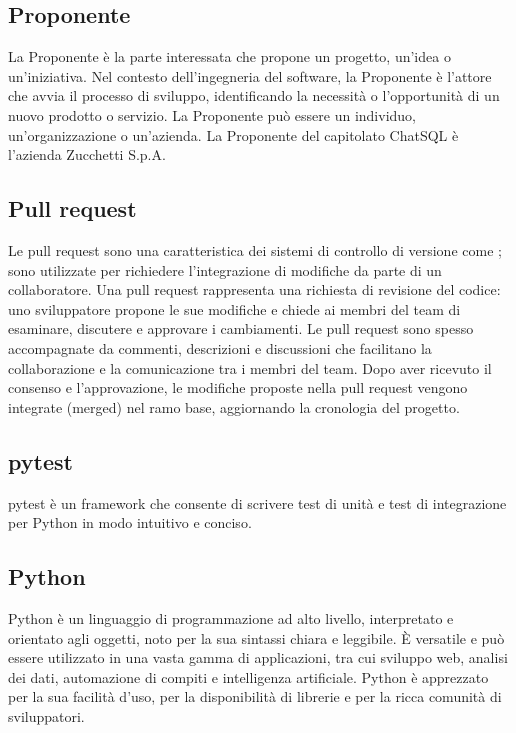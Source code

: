 \vspace{2em}
\subsection*{Proponente}
\par La Proponente è la parte interessata che propone un progetto, un'idea o un'iniziativa. Nel contesto dell'ingegneria del software, la Proponente è l'attore che avvia il processo di sviluppo, identificando la necessità o l'opportunità di un nuovo prodotto o servizio. La Proponente può essere un individuo, un'organizzazione o un'azienda. La Proponente del capitolato ChatSQL è l'azienda Zucchetti S.p.A.

\vspace{2em}
\subsection*{Pull request}
\par Le pull request sono una caratteristica dei sistemi di controllo di versione come ; sono utilizzate per richiedere l'integrazione di modifiche da parte di un collaboratore. Una pull request rappresenta una richiesta di revisione del codice: uno sviluppatore propone le sue modifiche e chiede ai membri del team di esaminare, discutere e approvare i cambiamenti. Le pull request sono spesso accompagnate da commenti, descrizioni e discussioni che facilitano la collaborazione e la comunicazione tra i membri del team. Dopo aver ricevuto il consenso e l'approvazione, le modifiche proposte nella pull request vengono integrate (merged) nel ramo base, aggiornando la cronologia del progetto.

\vspace{2em}
\subsection*{pytest}
\par pytest è un framework che consente di scrivere test di unità e test di integrazione per Python in modo intuitivo e conciso.

\vspace{2em}
\subsection*{Python}
\par Python è un linguaggio di programmazione ad alto livello, interpretato e orientato agli oggetti, noto per la sua sintassi chiara e leggibile. È versatile e può essere utilizzato in una vasta gamma di applicazioni, tra cui sviluppo web, analisi dei dati, automazione di compiti e intelligenza artificiale. Python è apprezzato per la sua facilità d'uso, per la disponibilità di librerie e per la ricca comunità di sviluppatori.

